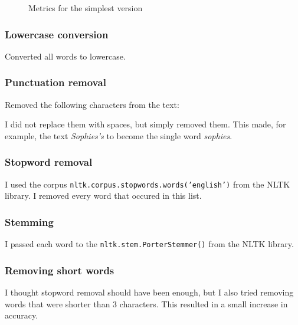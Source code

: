 \begin{figure}[htpb]
    \caption{Metrics for the simplest version}
    \label{fig:bayes_simplest_metrics}
    \begin{tcolorbox}
        
    \end{tcolorbox}
\end{figure}

\subsubsection{Lowercase conversion}
\label{sec:bayes_lowercase}

Converted all words to lowercase.

\subsubsection{Punctuation removal}
\label{sec:bayes_punctuation}

Removed the following characters from the text:


I did not replace them with spaces, but simply removed them. This made, for example, the text \emph{Sophies's} to become the single word \emph{sophies}.

\subsubsection{Stopword removal}
\label{sec:bayes_stopwords}

I used the corpus \texttt{nltk.corpus.stopwords.words('english')} from the NLTK library. I removed every word that occured in this list.

\subsubsection{Stemming}
\label{sec:bayes_stemming}

I passed each word to the \texttt{nltk.stem.PorterStemmer()} from the NLTK library.

\subsubsection{Removing short words}
\label{sec:bayes_shortwords}

I thought stopword removal should have been enough, but I also tried removing words that were shorter than 3 characters. This resulted in a small increase in accuracy.

